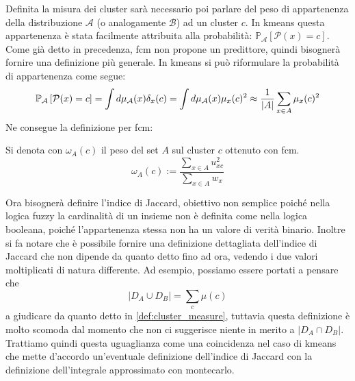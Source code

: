 \noindent Definita la misura dei cluster sarà necessario poi parlare del peso di appartenenza della distribuzione $\mathcal{A}$ (o analogamente $\mathcal{B}$) ad un cluster $c$. In \gls{kmeans} questa appartenenza è stata facilmente attribuita alla probabilità: $\mathbb{P}_\mathcal{A}\left[\mathcal{P}(x)=c\right]$. Come già detto in precedenza, \gls{fcm} non propone un predittore, quindi bisognerà fornire una definizione più generale. In \gls{kmeans} si può riformulare la probabilità di appartenenza come segue:
\begin{equation*}
	\mathbb{P}_\mathcal{A}\left[\mathcal{P}(x)=c\right] = \int d\mu_\mathcal{A}(x) \delta_x(c) = \int d\mu_\mathcal{A}(x) \mu_x(c)^2 \approx \frac{1}{|A|}\sum_{x\in A} \mu_x(c)^2\\
\end{equation*}
Ne consegue la definizione per \gls{fcm}:
\begin{definition}
\label{def:weightovercluster}
	Si denota con $\omega_A(c)$ il peso del set $A$ sul cluster $c$ ottenuto con \gls{fcm}.
	\begin{equation}
		\omega_A(c) := \frac{\sum_{x\in A} u_{xc}^2}{\sum_{x\in A}w_x}
	\end{equation}
\end{definition}

\noindent Ora bisognerà definire l'indice di Jaccard, obiettivo non semplice poiché nella logica fuzzy la cardinalità di un insieme non è definita come nella logica booleana, poiché l'appartenenza stessa non ha un valore di verità binario. Inoltre si fa notare che è possibile fornire una definizione dettagliata dell'indice di Jaccard che non dipende da quanto detto fino ad ora, vedendo i due valori moltiplicati di natura differente. Ad esempio, possiamo essere portati a pensare che
\[
|D_A \cup D_B| = \sum_c \mu(c)
\]
a giudicare da quanto detto in \cref{def:cluster_measure}, tuttavia questa definizione è molto scomoda dal momento che non ci suggerisce niente in merito a $|D_A \cap D_B|$. Trattiamo quindi questa uguaglianza come una coincidenza nel caso di \gls{kmeans} che mette d'accordo un'eventuale definizione dell'indice di Jaccard con la definizione dell'integrale approssimato con \gls{montecarlo}.

